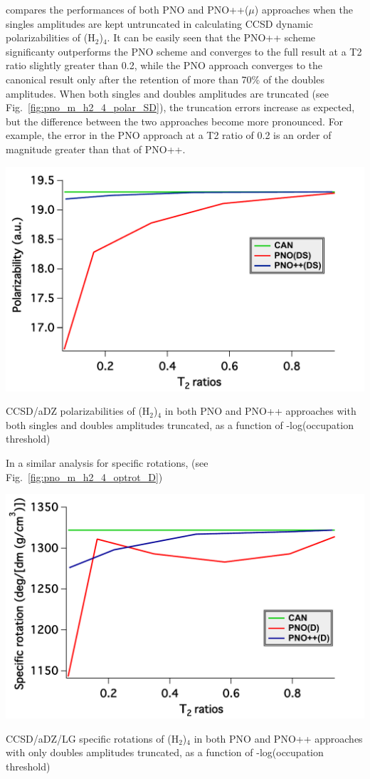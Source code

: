 compares the performances of both PNO and PNO++($\mu$) approaches when the singles
amplitudes are kept untruncated in calculating CCSD dynamic polarizabilities 
of (H$_2$)$_4$. It can be easily seen that the PNO++ scheme significanty outperforms 
the PNO scheme and converges to the full result at a T2 ratio slightly greater 
than 0.2, while the PNO approach converges to the canonical result only after the retention
of more than 70\% of the doubles amplitudes. When both singles and doubles amplitudes
are truncated (see Fig.~\ref{fig:pno_m_h2_4_polar_SD}), the truncation errors increase
as expected, but the difference between the two approaches become more pronounced.
For example, the error in the PNO approach at a T2 ratio of 0.2 is an order of
magnitude greater than that of PNO++. 
\begin{MyFigure}[h!]
\centering
\includegraphics[width=0.6\linewidth,natwidth=610,natheight=642]{figures_pno++/h2_4_polar_DS.pdf}
\caption{{\footnotesize CCSD/aDZ polarizabilities of (H$_2$)$_4$ in both PNO and PNO++ approaches
with both singles and doubles amplitudes truncated, as a function of -log(occupation threshold)}}
\label{fig:pno_m_h2_4_polar_SD}
\end{MyFigure}
In a similar analysis for specific rotations, (see Fig.~\ref{fig:pno_m_h2_4_optrot_D})
\begin{MyFigure}[h!]
\centering
\includegraphics[width=0.6\linewidth,natwidth=610,natheight=642]{figures_pno++/h2_4_optrot_lg_D.pdf}
\caption{{\footnotesize CCSD/aDZ/LG specific rotations of (H$_2$)$_4$ in both PNO and PNO++ approaches
with only doubles amplitudes truncated, as a function of -log(occupation threshold)}}
\label{fig:pno_m_h2_4_optrot_D}
\end{MyFigure}
